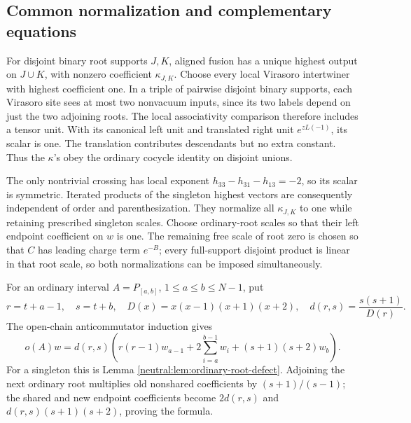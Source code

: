 \documentclass[11pt,a4paper]{article}
\numberwithin{equation}{section}
\theoremstyle{definition}\newtheorem{definition}[theorem]{Definition}
\theoremstyle{remark}\newtheorem{remark}[theorem]{Remark}
\begin{document}
\subsection{Common normalization and complementary equations}

For disjoint binary root supports \(J,K\), aligned fusion has a
unique highest output on \(J\cup K\), with nonzero coefficient
\(\kappa_{J,K}\). Choose every local Virasoro intertwiner with
highest coefficient one. In a triple of pairwise disjoint binary
supports, each Virasoro site sees at most two nonvacuum inputs,
since its two labels depend on just the two adjoining roots.
The local associativity comparison therefore includes a tensor
unit. With its canonical left unit and translated right unit
\(e^{zL(-1)}\), its scalar is one. The translation contributes
descendants but no extra constant. Thus the \(\kappa\)'s obey
the ordinary cocycle identity on disjoint unions.

The only nontrivial crossing has local exponent
\(h_{33}-h_{31}-h_{13}=-2\), so its scalar is symmetric.
Iterated products of the singleton highest vectors are consequently
independent of order and parenthesization. They normalize all
\(\kappa_{J,K}\) to one while retaining prescribed singleton scales.
Choose ordinary-root scales so that their left endpoint coefficient
on \(w\) is one. The remaining free scale of root zero is chosen
so that \(C\) has leading charge term \(e^{-B}\); every full-support
disjoint product is linear in that root scale, so both normalizations
can be imposed simultaneously.

For an ordinary interval \(A=P_{[a,b]}\), \(1\le a\le b\le N-1\),
put
\[
 r=t+a-1,\quad s=t+b,\quad
 D(x)=x(x-1)(x+1)(x+2),\quad d(r,s)=\frac{s(s+1)}{D(r)}.
\]
The open-chain anticommutator induction gives
\begin{equation}\label{r:eq:ordinaryclosed}
 o(A)w=d(r,s)\left(r(r-1)w_{a-1}
                +2\sum_{i=a}^{b-1}w_i+(s+1)(s+2)w_b\right).
\end{equation}
For a singleton this is Lemma \ref{neutral:lem:ordinary-root-defect}. Adjoining the
next ordinary root multiplies old nonshared coefficients by
\((s+1)/(s-1)\); the shared and new endpoint coefficients become
\(2d(r,s)\) and \(d(r,s)(s+1)(s+2)\), proving the formula.
\end{document}
